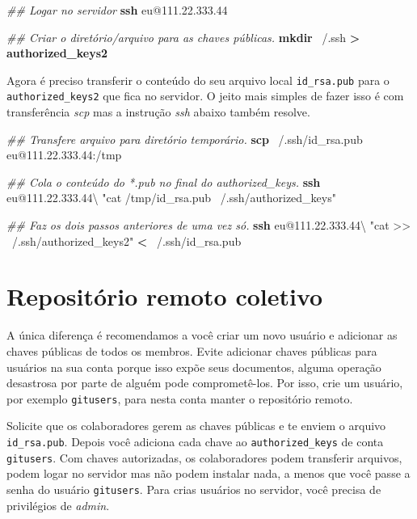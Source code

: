 \documentclass[
  a5paper,
  pagesize,
  9pt,
  pointlessnumbers,
  normalheadings,
  twoside=false
]{book}
\newenvironment{Shaded}{\begin{snugshade}}{\end{snugshade}}
\newcommand{\KeywordTok}[1]{\textcolor[rgb]{0.13,0.29,0.53}{\textbf{{#1}}}}
\newcommand{\StringTok}[1]{\textcolor[rgb]{0.31,0.60,0.02}{{#1}}}
\newcommand{\CommentTok}[1]{\textcolor[rgb]{0.56,0.35,0.01}{\textit{{#1}}}}
\newcommand{\NormalTok}[1]{{#1}}
\begin{document}
\begin{Shaded}
\begin{Highlighting}[]
\CommentTok{## Logar no servidor}
\KeywordTok{ssh} \NormalTok{eu@111.22.333.44}

\CommentTok{## Criar o diretório/arquivo para as chaves públicas.}
\KeywordTok{mkdir} \NormalTok{~/.ssh}
 \KeywordTok{>} \KeywordTok{authorized_keys2}
\end{Highlighting}
\end{Shaded}

Agora é preciso transferir o conteúdo do seu arquivo local
\texttt{id\_rsa.pub} para o \texttt{authorized\_keys2} que fica no
servidor. O jeito mais simples de fazer isso é com transferência
\emph{scp} mas a instrução \emph{ssh} abaixo também resolve.

\begin{Shaded}
\begin{Highlighting}[]
\CommentTok{## Transfere arquivo para diretório temporário.}
\KeywordTok{scp} \NormalTok{~/.ssh/id_rsa.pub eu@111.22.333.44:/tmp}

\CommentTok{## Cola o conteúdo do *.pub no final do authorized_keys.}
\KeywordTok{ssh} \NormalTok{eu@111.22.333.44\textbackslash{}}
  \StringTok{"cat /tmp/id_rsa.pub ~/.ssh/authorized_keys"}

\CommentTok{## Faz os dois passos anteriores de uma vez só.}
\KeywordTok{ssh} \NormalTok{eu@111.22.333.44\textbackslash{}}
  \StringTok{"cat >> ~/.ssh/authorized_keys2"} \KeywordTok{<} \NormalTok{~/.ssh/id_rsa.pub}
\end{Highlighting}
\end{Shaded}

\section{Repositório remoto coletivo}\label{repositorio-remoto-coletivo}

A única diferença é recomendamos a você criar um novo usuário e
adicionar as chaves públicas de todos os membros. Evite adicionar chaves
públicas para usuários na sua conta porque isso expõe seus documentos,
alguma operação desastrosa por parte de alguém pode comprometê-los. Por
isso, crie um usuário, por exemplo \texttt{gitusers}, para nesta conta
manter o repositório remoto.

Solicite que os colaboradores gerem as chaves públicas e te enviem o
arquivo \texttt{id\_rsa.pub}. Depois você adiciona cada chave ao
\texttt{authorized\_keys} de conta \texttt{gitusers}. Com chaves
autorizadas, os colaboradores podem transferir arquivos, podem logar no
servidor mas não podem instalar nada, a menos que você passe a senha do
usuário \texttt{gitusers}. Para crias usuários no servidor, você precisa
de privilégios de \emph{admin}.
\end{document}

